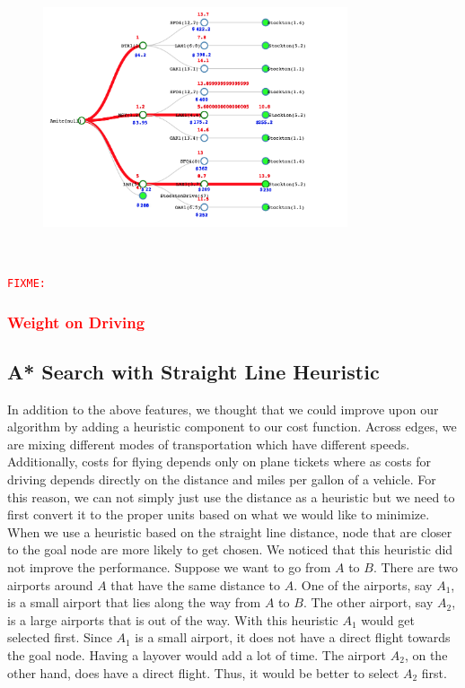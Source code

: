 \documentclass[11pt]{article}
\newcommand{\FIXME}[1]{ \ \\ \hspace* {-1.5 cm}
  \textcolor{red}{\texttt{FIXME:}#1} \medskip\par}
\begin{document}
\begin{figure}[!ht]
  \centering
  \includegraphics[width=0.8\textwidth]{time_lim}
  \label{fig:time_lim}
\end{figure}


\FIXME{\subsubsection{Weight on Driving}}

\subsection{A* Search with Straight Line Heuristic}

In addition to the above features, we thought that we could improve upon our algorithm by adding a heuristic component to our cost function. 
Across edges, we are mixing different modes of transportation which have different speeds. Additionally, costs for flying depends only on plane tickets where as costs for driving depends directly on the distance and miles per gallon of a vehicle. 
For this reason, we can not simply just use the distance as a heuristic but we need to first convert it to the proper units based on what we would like to minimize.\\
When we use a heuristic based on the straight line distance, node that are closer to the goal node are more likely to get chosen. We noticed that this heuristic did not improve the performance. Suppose we want to go from $A$ to $B$. There are two airports around $A$ that have the same distance to $A$. One of the airports, say $A_1$, is a small airport that lies along the way from $A$ to $B$. The other airport, say $A_2$, is a large airports that is out of the way. With this heuristic $A_1$ would get selected first. Since $A_1$ is a small airport, it does not have a direct flight towards the goal node. Having a layover would add a lot of time. The airport $A_2$, on the other hand, does have a direct flight. Thus, it would be better to select $A_2$ first. 
\end{document}
